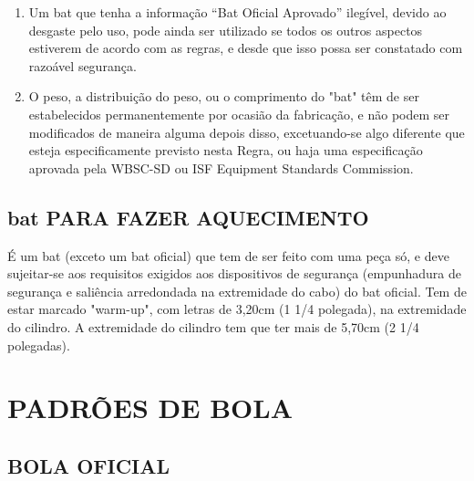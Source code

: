 \begin{multicols}{2}
\begin{enumerate}[label= \arabic*)]
		\item  Um \gls{bat} que tenha a informa\c{c}\~ao “Bat Oficial Aprovado” ilegível, devido ao desgaste pelo uso, pode ainda ser utilizado se todos os outros aspectos estiverem de acordo com as regras, e desde que isso possa ser constatado com razo\'avel seguran\c{c}a.
		\item  O peso, a distribui\c{c}\~ao do peso, ou o comprimento do "bat" t\^em de ser estabelecidos permanentemente por ocasi\~ao da fabrica\c{c}\~ao, e n\~ao podem ser modificados de maneira alguma depois disso, excetuando-se algo diferente que esteja especificamente previsto nesta Regra, ou haja uma especifica\c{c}\~ao aprovada pela WBSC-SD ou ISF Equipment Standards Commission.
	\end{enumerate}
\end{multicols}

\section{\gls{bat} PARA FAZER AQUECIMENTO}
\begin{multicols}{2}
	É um \gls{bat} (exceto um \gls{bat} oficial) que tem de ser feito com uma pe\c{c}a s\'o, e deve sujeitar-se aos requisitos exigidos aos dispositivos de seguran\c{c}a (empunhadura de seguran\c{c}a e sali\^encia arredondada na extremidade do cabo) do \gls{bat} oficial. Tem de estar marcado "warm-up", com letras de 3,20cm (1 1/4 polegada), na extremidade do
	cilindro. A extremidade do cilindro tem que ter mais de 5,70cm (2 1/4 polegadas).

\end{multicols}


\chapter{PADRÕES DE BOLA}
\label{ap:Bola}

\section{BOLA OFICIAL}



